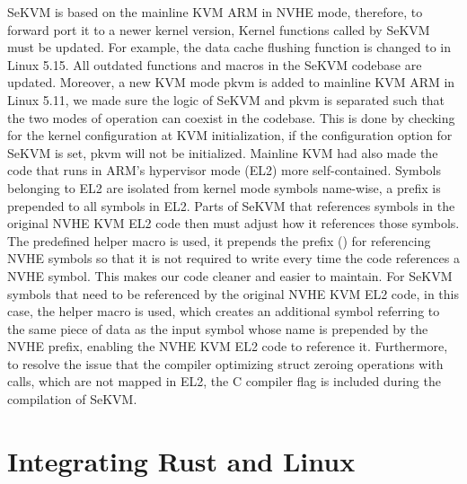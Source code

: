 SeKVM is based on the mainline KVM ARM in NVHE mode, therefore, to forward port
it to a newer kernel version, Kernel functions called by SeKVM must be updated. For example,
the data cache flushing function  is changed to
 in Linux 5.15.
All outdated functions and macros in the SeKVM codebase are updated.
Moreover, a new KVM mode pkvm \cite{pkvm} is added to mainline KVM ARM in Linux
5.11, we made sure the logic of SeKVM and pkvm is separated such that the two
modes of operation can coexist in the codebase. This is done by checking for
the kernel configuration at KVM initialization, if the configuration option for
SeKVM is set, pkvm will not be initialized.
Mainline KVM had also made the code that runs in ARM's hypervisor mode (EL2)
more self-contained. Symbols belonging to EL2 are isolated from kernel mode
symbols name-wise, a prefix  is prepended to all symbols
in EL2.
Parts of SeKVM that references symbols in the original NVHE KVM EL2 code then
must adjust how it references those symbols. The predefined helper macro
 is used, it prepends the prefix ()
for referencing NVHE symbols so that it is not required to write
 every time the code references a NVHE symbol. This makes
our code cleaner and easier to maintain. For SeKVM symbols that
need to be referenced by the original NVHE KVM EL2 code, in this case, the helper
macro  is used, which creates an additional symbol referring to the
same piece of data as the input symbol whose name is prepended by the NVHE
prefix, enabling the NVHE KVM EL2 code to reference it.
Furthermore, to resolve the issue that the compiler optimizing struct zeroing
operations with  calls, which are not mapped in EL2, the C
compiler flag  is included during the compilation of
SeKVM.

\section{Integrating Rust and Linux}

%

